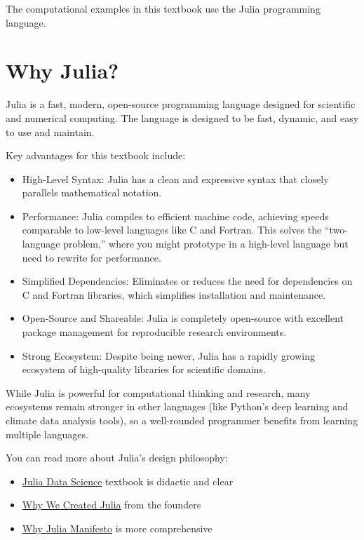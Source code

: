 \documentclass[
  letterpaper,
  DIV=11,
  numbers=noendperiod]{scrreprt}
\providecommand{\tightlist}{%
  \setlength{\itemsep}{0pt}\setlength{\parskip}{0pt}}
\begin{document}
The computational examples in this textbook use the Julia programming
language.

\section{Why Julia?}\label{why-julia}

Julia is a fast, modern, open-source programming language designed for
scientific and numerical computing. The language is designed to be fast,
dynamic, and easy to use and maintain.

Key advantages for this textbook include:

\begin{itemize}
\tightlist
\item
  High-Level Syntax: Julia has a clean and expressive syntax that
  closely parallels mathematical notation.
\item
  Performance: Julia compiles to efficient machine code, achieving
  speeds comparable to low-level languages like C and Fortran. This
  solves the ``two-language problem,'' where you might prototype in a
  high-level language but need to rewrite for performance.
\item
  Simplified Dependencies: Eliminates or reduces the need for
  dependencies on C and Fortran libraries, which simplifies installation
  and maintenance.
\item
  Open-Source and Shareable: Julia is completely open-source with
  excellent package management for reproducible research environments.
\item
  Strong Ecosystem: Despite being newer, Julia has a rapidly growing
  ecosystem of high-quality libraries for scientific domains.
\end{itemize}

While Julia is powerful for computational thinking and research, many
ecosystems remain stronger in other languages (like Python's deep
learning and climate data analysis tools), so a well-rounded programmer
benefits from learning multiple languages.

You can read more about Julia's design philosophy:

\begin{itemize}
\tightlist
\item
  \href{https://juliadatascience.io/why_julia}{Julia Data Science}
  textbook is didactic and clear
\item
  \href{https://julialang.org/blog/2012/02/why-we-created-julia/}{Why We
  Created Julia} from the founders
\item
  \href{https://github.com/Datseris/whyjulia-manifesto}{Why Julia
  Manifesto} is more comprehensive
\end{itemize}
\end{document}

